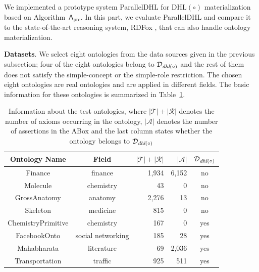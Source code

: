 We implemented a prototype system ParallelDHL for DHL$(\circ)$ materialization
based on Algorithm~$\mathsf{A}_{\text{prc}}$. In this part, we evaluate ParallelDHL and
compare it to the state-of-the-art reasoning system, RDFox \cite{MotikNPHO14},
that can also handle ontology materialization.

\textbf{Datasets}.
We select eight ontologies from the data sources given in the previous subsection;
four of the eight ontologies belong to $\mathcal{D}_{\textit{\text{dhl}}(\circ)}$ and
the rest of them does not satisfy the simple-concept or the simple-role
restriction.
The chosen eight ontologies are real ontologies and are applied in different fields.
The basic information for these ontologies
is summarized in Table~\ref{tab:info}.

\begin{table}[htb]
\centering
\caption{Information about the test ontologies, where
  $|\mathcal{T}|+|\mathcal{R}|$ denotes the number of axioms occurring
  in the ontology, $|\mathcal{A}|$ denotes the number of assertions
  in the ABox and the last column states whether the
  ontology belongs to $\mathcal{D}_{\textit{\text{dhl}}(\circ)}$}
\begin{tabular}{>{\hspace*{5mm}}ccrrc<{\hspace*{5mm}}}
\hline
\textbf{Ontology Name} & \textbf{Field} &
                                          $|\mathcal{T}|+|\mathcal{R}|$
  & $|\mathcal{A}|$ & $\mathcal{D}_{\textit{\text{dhl}}(\circ)}$\\
\hline

Finance&finance&1,934&6,152&no\\

Molecule&chemistry&43&0&no\\

GrossAnatomy&anatomy&2,276&13&no\\

Skeleton&medicine&815&0&no\\

\hline

ChemistryPrimitive&chemistry&167&0& yes\\

FacebookOnto&social networking&185&28& yes\\

Mahabharata&literature&69&2,036& yes\\

Transportation&traffic&925&511& yes\\

\hline
\end{tabular}
\label{tab:info}
\end{table}

